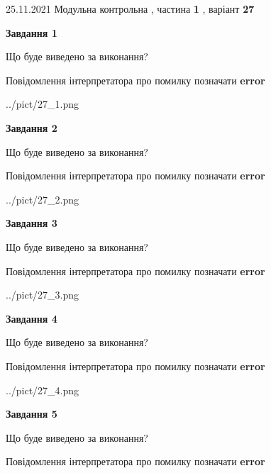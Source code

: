\documentclass[10pt, ukrainian]{article}
\begin{document}
{25.11.2021 Модульна контрольна , частина \textbf { 1 }, варіант  \No \textbf { 27 }\par}
{
\begin {large}

{\begin {center}\textbf{Завдання 1}\end {center}}\par
Що буде виведено за виконання? \par
Повідомлення інтерпретатора про помилку позначати \textbf{error}

\begin{center}
	{../pict/27_1.png}
\end{center}
\newpage

{\begin {center}\textbf{Завдання 2}\end {center}}\par
Що буде виведено за виконання? \par
Повідомлення інтерпретатора про помилку позначати \textbf{error}

\begin{center}
	{../pict/27_2.png}
\end{center}
\newpage

{\begin {center}\textbf{Завдання 3}\end {center}}\par
Що буде виведено за виконання? \par
Повідомлення інтерпретатора про помилку позначати \textbf{error}

\begin{center}
	{../pict/27_3.png}
\end{center}
\newpage

{\begin {center}\textbf{Завдання 4}\end {center}}\par
Що буде виведено за виконання? \par
Повідомлення інтерпретатора про помилку позначати \textbf{error}

\begin{center}
	{../pict/27_4.png}
\end{center}
\newpage

{\begin {center}\textbf{Завдання 5}\end {center}}\par
Що буде виведено за виконання? \par
Повідомлення інтерпретатора про помилку позначати \textbf{error}


\end{large}}
\end{document}
